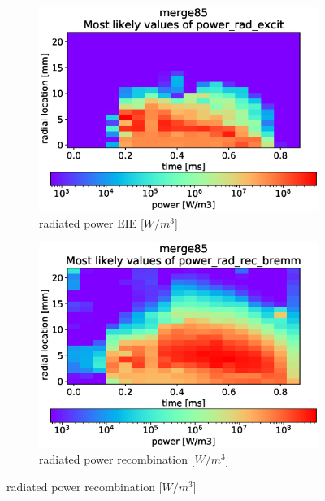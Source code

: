 \begin{figure}
	\centering
     \begin{subfigure}{0.48\linewidth}
    	\includegraphics[width=\linewidth,trim={0 30 0 45},clip]{Chapters/chapter3/figs/_merge85_global_fit_example2.eps}
         \caption{radiated power EIE [$W/m^3$]}
        \label{fig:bayes_example_1a}
    \end{subfigure}
    \hfill
    \begin{subfigure}{0.48\linewidth}
    	\includegraphics[width=\linewidth,trim={0 30 0 45},clip]{Chapters/chapter3/figs/_merge85_global_fit_example3.eps}
         \caption{radiated power recombination [$W/m^3$]}

\end{subfigure}
\end{figure}
